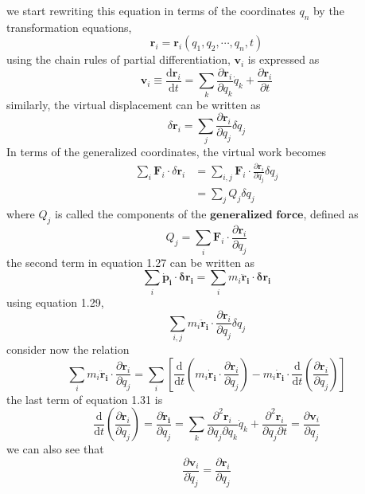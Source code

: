 \documentclass[]{article}
\numberwithin{equation}{section}
\begin{document}
we start rewriting this equation in terms of the coordinates $q_n$ by the transformation equations, 
$$\mathbf r_i=\mathbf r_i(q_1,q_2,\cdots,q_n,t)$$
using the chain rules of partial differentiation, $\mathbf v_i$ is expressed as 
\begin{equation}\mathbf v_i\equiv\frac{\mathrm d\mathbf r_i}{\mathrm dt}=\sum_k\frac{\partial\mathbf r_i}{\partial q_k}\dot q_k+\frac{\partial\mathbf r_i}{\partial t}\end{equation}
similarly, the virtual displacement can be written as 
\begin{equation}\delta\mathbf r_i=\sum_j\frac{\partial\mathbf r_i}{\partial q_j}\delta q_j\end{equation}
In terms of the generalized coordinates, the virtual work becomes 
\begin{align*}
	\sum_i\mathbf F_i\cdot\delta\mathbf r_i&=\sum_{i,j}\mathbf F_i\cdot\frac{\partial\mathbf r_i}{\partial q_j}\delta q_j\\
	&=\sum_jQ_j\delta q_j
\end{align*}
where $Q_j$ is called the components of the $\textbf{generalized force}$, defined as
\begin{equation}\boxed{Q_j=\sum_i\mathbf F_i\cdot\frac{\partial\mathbf r_i}{\partial q_j}}\end{equation}
the second term in equation 1.27 can be written as 
$$\sum_i\mathbf{\dot p_i\cdot\delta r_i}=\sum_i m_i\mathbf{\ddot r_i\cdot\delta r_i}$$
using equation 1.29,
$$\sum_{i,j}m_i\mathbf{\ddot r_i}\cdot\frac{\partial\mathbf r_i}{\partial q_j}\delta q_j$$
consider now the relation
\begin{equation}\sum_im_i\mathbf{\ddot r_i}\cdot\frac{\partial\mathbf r_i}{\partial q_j}=\sum_i\left[\frac{\mathrm d}{\mathrm dt}\left(m_i\mathbf{\dot r_i}\cdot\frac{\partial\mathbf r_i}{\partial q_j}\right)-m_i\mathbf{\dot r_i}\cdot\frac{\mathrm d}{\mathrm dt}\left(\frac{\partial\mathbf r_i}{\partial q_j}\right)\right]\end{equation}
the last term of equation 1.31 is 
$$\frac{\mathrm d}{\mathrm dt}\left(\frac{\partial\mathbf r_i}{\partial q_j}\right)=\frac{\partial\mathbf{\dot r_i}}{\partial q_j}=\sum_k\frac{\partial^2\mathbf r_i}{\partial q_j\partial q_k}\dot q_k+\frac{\partial^2\mathbf r_i}{\partial q_j\partial t}=\frac{\partial\mathbf v_i}{\partial q_j}$$
we can also see that
\begin{equation}\frac{\partial\mathbf v_i}{\partial\dot q_j}=\frac{\partial\mathbf r_i}{\partial q_j}\end{equation}
\end{document}
